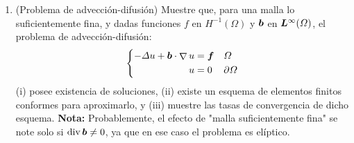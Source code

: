 \documentclass{article}
\renewcommand{\vec}{\vectorsym}
\DeclareMathOperator{\grad}{\nabla}
\DeclareMathOperator{\dive}{\text{div}}
\begin{document}
\begin{enumerate}
    \item (Problema de advección-difusión) Muestre que, para una malla lo suficientemente fina, y dadas funciones $f$ en $H^{-1}(\Omega)$ y $\vec b$ en $\vec L^\infty(\Omega)$, el problema de advección-difusión: 
         $$
        \left\{\begin{aligned}
             -\Delta u + \vec b\cdot \grad u &= \vec f &&\Omega \\
            u &= 0 &&\partial\Omega
        \end{aligned}\right.
        $$
        (i) posee existencia de soluciones, (ii) existe un esquema de elementos finitos conformes para aproximarlo, y (iii) muestre las tasas de convergencia de dicho esquema. \textbf{Nota: }Probablemente, el efecto de "malla suficientemente fina" se note solo si $\dive \vec b\neq 0$, ya que en ese caso el problema es elíptico. 
   
\end{enumerate}

\end{document}
